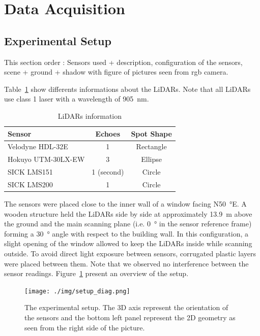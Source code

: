 \section{Data Acquisition}

\subsection{Experimental Setup}
This section order : Sensors used + description, configuration of the sensors, scene + ground + shadow with figure of pictures seen from rgb camera.



Table~\ref{tab:lidars} show differents informations about the LiDARs. Note that all LiDARs use class 1 laser with a wavelength of \SI{905}{\nano\meter}.
\begin{table}[htbp]
    \centering
    \begin{tabularx}{\linewidth}{|X||c|c|}\hline
        Sensor              & Echoes     & Spot Shape \\ \hline%
        Velodyne HDL-32E    & 1          & Rectangle  \\ \hline
        Hokuyo UTM-30LX-EW  & 3          & Ellipse    \\ \hline
        SICK LMS151         & 1 (second) & Circle     \\ \hline
        SICK LMS200         & 1          & Circle     \\ \hline
    \end{tabularx}
    \caption{LiDARs information}\label{tab:lidars}
\end{table}


 The sensors were placed close to the inner wall of a window facing N\SI{50}{\degree}E. A wooden structure held the LiDARs side by side at approximately \SI{13.9}{\meter} above the ground and the main scanning plane (i.e. \SI{0}{\degree} in the sensor reference frame) forming a \SI{30}{\degree} angle with respect to the building wall. In this configuration, a slight opening of the window allowed to keep the LiDARs inside while scanning outside. To avoid direct light exposure between sensors, corrugated plastic layers were placed between them. Note that we observed no interference between the sensor readings. Figure~\ref{fig:setup} present an overview of the setup.

\begin{figure}[h]
    \centering
    \texttt{[image: ./img/setup\_diag.png]}
    \caption{The experimental setup. The 3D axis represent the orientation of the sensors and the bottom left panel represent the 2D geometry as seen from the right side of the picture.}
    \label{fig:setup}
\end{figure}

